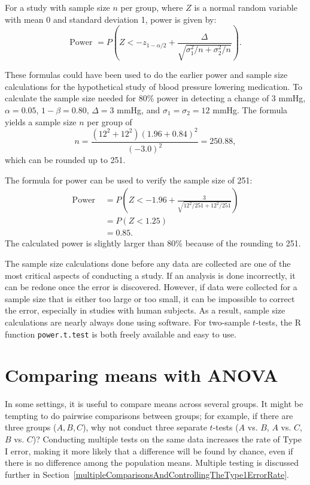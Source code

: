 \textD{\newpage}

For a study with sample size $n$ per group, where $Z$ is a normal random variable with mean 0 and standard deviation 1, power is given by:
\[
	\text{Power } = P\left(  Z <-z_{1 - \alpha/2} + \frac{\Delta}
	{\sqrt{\sigma_1^2/n + \sigma_2^2/n}}\right).
\]

These formulas could have been used to do the earlier power and sample size calculations for the hypothetical study of blood pressure lowering medication. To calculate the sample size needed for 80\% power in detecting a change of 3 mmHg, $\alpha = 0.05$, $1 - \beta = 0.80$, $\Delta = 3$ mmHg, and $\sigma_1 = \sigma_2 = 12$ mmHg. The formula yields a sample size $n$ per group of 
\[n = \frac{(12^2 + 12^2)(1.96 + 0.84)^2}{(-3.0)^2} = 250.88, \]
which can be rounded up to 251.

The formula for power can be used to verify the sample size of 251:
\begin{align*}
	\text{Power } &= P\left(Z < -1.96 + \frac{3}
	{\sqrt{12^2/251 + 12^2/251}}\right) \\
	&= P(Z < 1.25) \\
	&= 0.85.
\end{align*}
The calculated power is slightly larger than 80\% because of the rounding to 251.

The sample size calculations done before any data are collected are one of the most critical aspects of conducting a study. If an analysis is done incorrectly, it can be redone once the error is discovered. However, if data were collected for a sample size that is either too large or too small, it can be impossible to correct the error, especially in studies with human subjects. As a result, sample size calculations are nearly always done using software. For two-sample $t$-tests, the \textsf{R} function \texttt{power.t.test} is both freely available and easy to use.


\section{Comparing means with ANOVA}
\label{anovaAndRegrWithCategoricalVariables}


In some settings, it is useful to compare means across several groups. It might be tempting to do pairwise comparisons between groups; for example, if there are three groups ($A, B, C$), why not conduct three separate $t$-tests ($A$ vs. $B$, $A$ vs. $C$, $B$ vs. $C$)? Conducting multiple tests on the same data increases the rate of Type I error, making it more likely that a difference will be found by chance, even if there is no difference among the population means. Multiple testing is discussed further in Section~\ref{multipleComparisonsAndControllingTheType1ErrorRate}.

